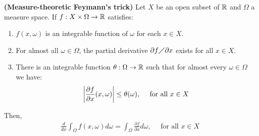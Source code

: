\documentclass{report}
\begin{document}
\begin{theorem}
\label{THmtFt}
\textbf{(Measure-theoretic Feymann's trick)} Let $X$ be an open subset of $\mathbb{R}$ and  $\Omega$ a measure space. If $f:X\times \Omega \rightarrow \mathbb{R}$ satisfies:
\begin{enumerate}[label=(\Roman*)]
  \item $f(x,\omega)$ is an integrable function of $\omega$ for each $x \in X$. 
  \item For almost all $\omega \in \Omega$, the partial derivative $\partial f \diagup \partial x$ exists for all $x \in X$. 
  \item There is an integrable function  $\theta: \Omega \rightarrow \mathbb{R}$ such that for almost every  $\omega \in \Omega$ we have:  
 \begin{align*}
   \left|\frac{\partial f}{\partial x} (x,\omega)\right|\leq \theta (\omega) ,\quad \text{ for all }x \in X
 \end{align*}
\end{enumerate}
Then, 
\begin{align*}
\frac{d}{dx} \int_{\Omega} f(x,\omega) d \omega = \int_{\Omega} \frac{\partial f}{\partial x}d\omega,\quad \text{ for all }x\in X
\end{align*}
\end{theorem}
\end{document}
